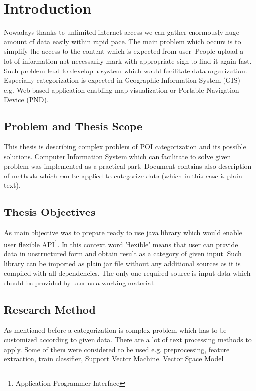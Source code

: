 \chapter{Introduction} \label{chap.introduction} 
{Nowadays thanks to unlimited internet access we can gather enormously huge amount of data easily within rapid pace. The main problem which occurs is to simplify the access to the content which is expected from user. People upload a lot of information not necessarily mark with appropriate sign to find it again fast. Such problem lead to develop a system which would facilitate data organization. Especially categorization is expected in Geographic Information System (GIS) e.g. Web-based application enabling map visualization or Portable Navigation Device (PND).

}


\section{Problem and Thesis Scope}
This thesis is describing complex problem of POI categorization and its possible solutions. Computer Information System which can facilitate to solve given problem was implemented as a practical part. Document contains also description of methods which can be applied to categorize data (which in this case is plain text). 

\section{Thesis Objectives}
As main objective was to prepare ready to use java library which would enable user flexible API\footnote{Application Programmer Interface}. In this context word 'flexible' means that user can provide data in unstructured form and obtain result as a category of given input. Such library can be imported as plain jar file without any additional sources as it is compiled with all dependencies. The only one required source is input data which should be provided by user as a working material. 

\section{Research Method}
As mentioned before a categorization is complex problem which has to be customized according to given data. There are a lot of text processing methods to apply. Some of them were considered to be used e.g. preprocessing, feature extraction, train classifier, Support Vector Machine, Vector Space Model.

